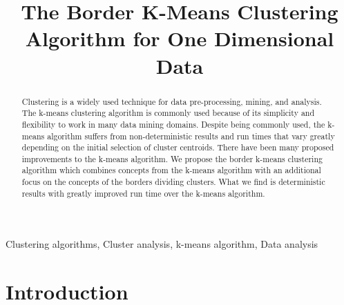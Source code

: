 \documentclass[conference,compsoc]{IEEEtran}
\begin{document}
\title{The Border K-Means Clustering Algorithm for One Dimensional Data}

\author{
\and

\and

}

\maketitle

\begin{abstract}
Clustering is a widely used technique for data pre-processing, mining, and analysis. The k-means clustering algorithm is commonly used because of its simplicity and flexibility to work in many data mining domains. Despite being commonly used, the k-means algorithm suffers from non-deterministic results and run times that vary greatly depending on the initial selection of cluster centroids. There have been many proposed improvements to the k-means algorithm. We propose the border k-means clustering algorithm which combines concepts from the k-means algorithm with an additional focus on the concepts of the borders dividing clusters. What we find is deterministic results with greatly improved run time over the k-means algorithm.
\end{abstract}

\begin{IEEEkeywords}
Clustering algorithms, Cluster analysis, k-means algorithm, Data analysis
\end{IEEEkeywords}

\section{Introduction}
\end{document}

